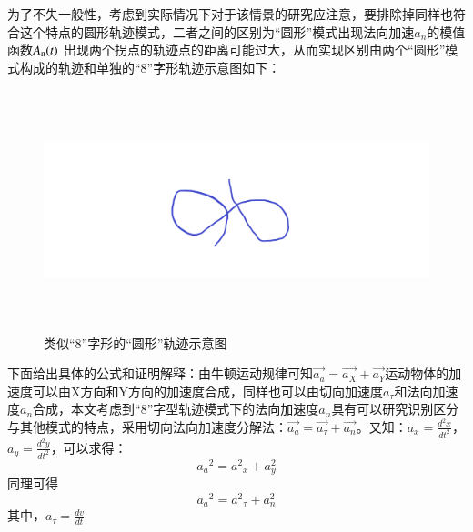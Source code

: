 \documentclass[GBK]{ctexart}
\begin{document}
\begin{spacing}{1.5}
为了不失一般性，考虑到实际情况下对于该情景的研究应注意，要排除掉同样也符合这个特点的圆形轨迹模式，二者之间的区别为“圆形”模式出现法向加速${a_n}$的模值函数${A_{\rm{n}}}(t)$ 出现两个拐点的轨迹点的距离可能过大，从而实现区别由两个“圆形”模式构成的轨迹和单独的“8”字形轨迹示意图如下：
\begin{figure}[H]
  \centering
  \includegraphics[width=15cm,height=7cm]{2yuan}
  \caption{类似“8”字形的“圆形”轨迹示意图}\label{2yuan}
\end{figure}

下面给出具体的公式和证明解释：由牛顿运动规律可知$\overrightarrow {{a_a}}  = \overrightarrow {{a_X}}  + \overrightarrow {{a_Y}} $运动物体的加速度可以由X方向和Y方向的加速度合成，同样也可以由切向加速度${a_\tau }$和法向加速度${a_n}$合成，本文考虑到“8”字型轨迹模式下的法向加速度${a_n}$具有可以研究识别区分与其他模式的特点，采用切向法向加速度分解法：$\overrightarrow {{a_a}}  = \overrightarrow {{a_\tau }}  + \overrightarrow {{a_n}} $。又知：${a_x} = \frac{{{d^2}x}}{{d{t^2}}}$，${a_y} = \frac{{{d^2}y}}{{d{t^2}}}$，可以求得：
\begin{equation}
{a_a}^2 = {a^2}_x + a_y^2
\end{equation}
同理可得
\begin{equation}
{a_a}^2 = {a^2}_\tau  + a_n^2
\end{equation}
其中，${a_\tau } = \frac{{dv}}{{dt}}$


\end{spacing}
\end{document}
